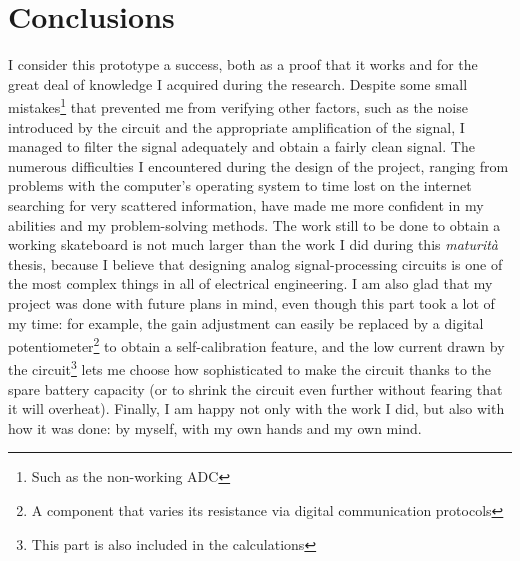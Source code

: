 \documentclass[a4paper, 10pt, final]{article} %
\begin{document}
    \section{Conclusions}
    I consider this prototype a success, both as a proof that it works and for the great deal of knowledge I acquired during the research.
    Despite some small mistakes\footnote{Such as the non-working ADC} that prevented me from verifying other factors, such as the noise introduced by the circuit and the appropriate amplification of the signal, I managed to filter the signal adequately and obtain a fairly clean signal.
    The numerous difficulties I encountered during the design of the project, ranging from problems with the computer's operating system to time lost on the internet searching for very scattered information, have made me more confident in my abilities and my problem-solving methods.
    The work still to be done to obtain a working skateboard is not much larger than the work I did during this \emph{maturit\`{a}} thesis, because I believe that designing analog signal-processing circuits is one of the most complex things in all of electrical engineering.
    I am also glad that my project was done with future plans in mind, even though this part took a lot of my time: for example, the gain adjustment can easily be replaced by a digital potentiometer\footnote{A component that varies its resistance via digital communication protocols} to obtain a self-calibration feature, and the low current drawn by the circuit\footnote{This part is also included in the calculations} lets me choose how sophisticated to make the circuit thanks to the spare battery capacity (or to shrink the circuit even further without fearing that it will overheat).
    Finally, I am happy not only with the work I did, but also with how it was done: by myself, with my own hands and my own mind.
\end{document}
